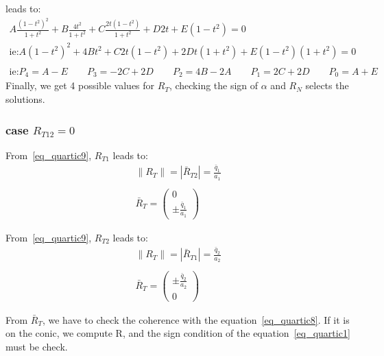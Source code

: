 leads to:
\begin{equation}
\label{eq_quartic13}
\begin{array}{l}
  A\frac{(1-t^2)^2}{1+t^2} +B\frac{4t^2}{1+t^2}+ C\frac{2t(1-t^2)}{1+t^2}+D2t+E(1-t^2)=0\\
\textrm{ie:}A(1-t^2)^2 + 4Bt^2+C2t(1-t^2)+2Dt(1+t^2)+E(1-t^2)(1+t^2)=0\\\\
\textrm{ie:}P_4=A-E\qquad P_3=-2C+2D \qquad P_2=4B-2A \qquad P_1=2C+2D \qquad P_0=A+E
 \end{array}
\end{equation}
Finally, we get 4 possible values for $R_T$, checking the sign of $\alpha$ and $R_N$ selects the solutions.

\subsubsection{case $R_{T12}=0$}
From~\ref{eq_quartic9}, $R_{T1}$ leads to:
\begin{equation}
\label{eq_quartic14}
\begin{array}{l}
  \parallel R_T \parallel=|\bar R_{T2}|=\frac{\bar q_1}{a_1}\\\\
  \bar R_T=\left(\begin{array}{c} 0 \\ \pm \frac{\bar q_1}{a_1} \end{array}\right)
 \end{array}
\end{equation}

From~\ref{eq_quartic9}, $R_{T2}$ leads to:
\begin{equation}
\label{eq_quartic14}
\begin{array}{l}
  \parallel R_T \parallel=|\bar R_{T1}|=\frac{\bar q_2}{a_2}\\\\
  \bar R_T=\left(\begin{array}{c}  \pm \frac{\bar q_2}{a_2} \\ 0 \end{array}\right)
 \end{array}
\end{equation}

From $\bar R_T$, we have to check the coherence with the equation~\ref{eq_quartic8}. If it is on the conic,  we compute R, and the sign condition of the equation~\ref{eq_quartic1} must be check.
